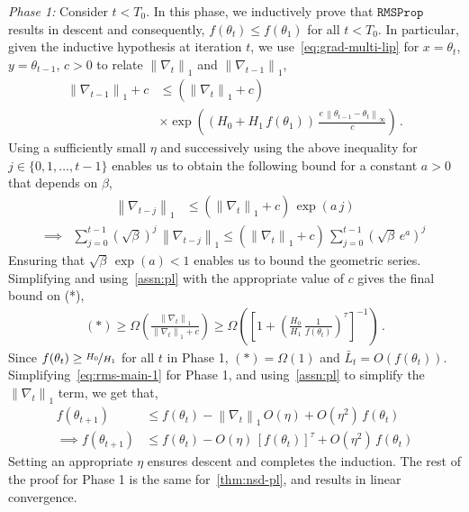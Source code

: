 \documentclass{article}
\newcommand{\norm}[1]{\left\|#1 \right\|}
\newcommand{\tht}{\theta_t}
\newcommand{\thtt}{\theta_{t+1}}
\newcommand{\RMS}{\texttt{RMSProp}}
\begin{document}
\textit{Phase 1:} Consider $t < T_0$. In this phase, we inductively prove that $\RMS$ results in descent and consequently, $f(\tht) \leq f(\theta_1)$ for all $t < T_0$. In particular, given the inductive hypothesis at iteration $t$, we use~\cref{eq:grad-multi-lip} for $x = \tht$, $y = \theta_{t-1}$, $c > 0$ to relate $\norm{\nabla_t}_1$ and $\norm{\nabla_{t-1}}_1$,
\begin{align}
\norm{\nabla_{t-1}}_1 + c & \leq (\norm{\nabla_{t}}_1 + c) \, \nonumber\\ & \times \exp\left((H_0 + H_1 \, f(\theta_1)) \, \frac{e \, \norm{\theta_{t-1} - \tht}_\infty}{c} \right) \,.    \nonumber
\end{align}
Using a sufficiently small $\eta$ and successively using the above inequality for $j \in \{0,1,\ldots,t-1\}$ enables us to obtain the following bound for a constant $a > 0$ that depends on $\beta$,
\begin{align}
\norm{\nabla_{t-j}}_1 & \leq (\norm{\nabla_{t}}_1 + c) \, \exp(a \, j) \nonumber
\end{align}
\begin{align}
\implies &  \sum_{j = 0}^{t-1} (\sqrt{\beta})^{j} \, \norm{\nabla_{t-j}}_1 \leq (\norm{\nabla_{t}}_1 + c)  \, \sum_{j = 0}^{t-1} (\sqrt{\beta} \, e^a)^j  \nonumber
\end{align}
Ensuring that $\sqrt{\beta} \, \exp(a) < 1$ enables us to bound the geometric series. Simplifying and using~\cref{assn:pl} with the appropriate value of $c$ gives the final bound on (*),
\begin{align}
(*) \geq \Omega \left( \frac{\norm{\nabla_t}_1}{\norm{\nabla_t}_1 + c} \right) \geq \Omega \left( \left[1 + \left(\frac{H_0}{H_1} \, \frac{1}{f(\tht)}\right)^{\tau} \right]^{-1} \right)\,. \nonumber
\end{align}
Since $f(\tht) \geq \nicefrac{H_0}{H_1}$ for all $t$ in Phase 1, $(*) = \Omega(1)$ and $\bar{L}_t = O(f(\tht))$. Simplifying~\cref{eq:rms-main-1} for Phase 1, and using~\cref{assn:pl} to simplify the $\norm{\nabla_t}_1$ term, we get that,  
\begin{align}
f(\thtt) & \leq f(\tht) - \norm{\nabla_t}_1 \, O(\eta) + O(\eta^2) \, f(\tht) \nonumber\\
\implies f(\thtt) & \leq  f(\tht) - O(\eta) \, [f(\tht)]^\tau + O(\eta^2) \, f(\tht) \nonumber
\end{align}
Setting an appropriate $\eta$ ensures descent and completes the induction. The rest of the proof for Phase 1 is the same for~\cref{thm:nsd-pl}, and results in linear convergence. 
\end{document}
